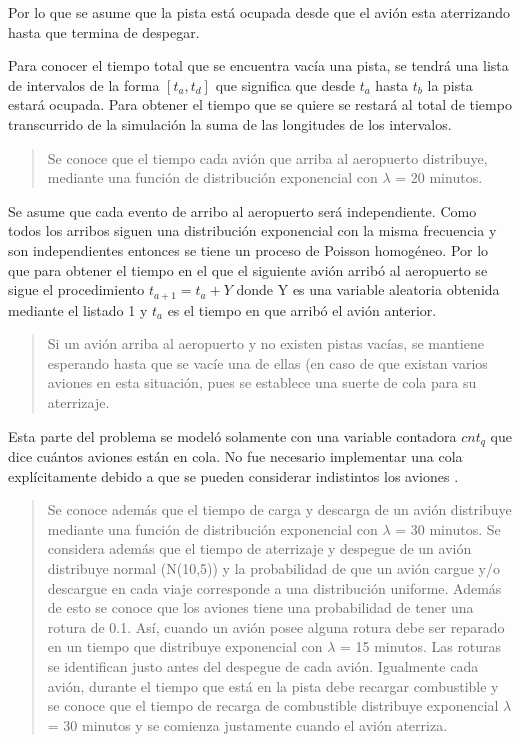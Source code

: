 \documentclass[12pt,letterpaper]{article}
\begin{document}
Por lo que se asume que la pista est\'a ocupada desde que el avi\'on esta aterrizando hasta que termina de despegar.

Para conocer el tiempo total  que se encuentra vac\'ia una pista, se tendr\'a una lista de intervalos de la forma $[t_a, t_d]$ que significa que desde $t_a$ hasta $t_b$ la pista estar\'a ocupada. Para obtener el tiempo que se quiere se restar\'a al total de tiempo transcurrido de la simulaci\'on la suma de las longitudes de los intervalos.

\begin{quote}
	Se conoce que el tiempo cada avión que arriba al aeropuerto distribuye,
mediante una función de distribución exponencial con $\lambda$ = 20 minutos.
\end{quote}

Se asume que cada evento de arribo al aeropuerto ser\'a independiente. Como todos los arribos siguen una distribuci\'on exponencial con la misma frecuencia y son independientes entonces se tiene un proceso de Poisson homog\'eneo. Por lo que para obtener el tiempo en el que el siguiente avi\'on arrib\'o al aeropuerto se sigue el procedimiento $t_{a+1} = t_a + Y$ donde Y es una variable aleatoria obtenida mediante el listado 1 y $t_a$ es el tiempo en que arrib\'o el avi\'on anterior.

\begin{quote}
	Si un avión arriba al aeropuerto y no existen pistas vac\'ias, se mantiene
	esperando hasta que se vac\'ie una de ellas (en caso de que existan varios aviones
	en esta situación, pues se establece una suerte de cola para su aterrizaje.
\end{quote}

Esta parte del problema se model\'o solamente con una variable contadora $cnt_q$ que dice cu\'antos aviones est\'an en cola. No fue necesario implementar una cola expl\'icitamente debido a que se pueden considerar indistintos los aviones .

\begin{quote}
	Se conoce además que el tiempo de carga y descarga de un avión distribuye mediante una función de distribución exponencial con $\lambda$ = 30 minutos. Se considera además que el tiempo de aterrizaje y despegue de un avión distribuye normal (N(10,5)) y la probabilidad de que un avión cargue y/o descargue en cada viaje corresponde a una distribución uniforme.	
	Además de esto se conoce que los aviones tiene una probabilidad de tener
	una rotura de 0.1. As\'i, cuando un avión posee alguna rotura debe ser reparado en un tiempo que distribuye exponencial con $\lambda$ = 15 minutos. Las roturas se identifican justo antes del despegue de cada avión. 
	Igualmente cada avión, durante el tiempo que está en la pista debe recargar combustible y se conoce que el tiempo de recarga de combustible distribuye exponencial $\lambda$ = 30 minutos y se comienza justamente cuando el avión aterriza.
\end{quote}
\end{document}
